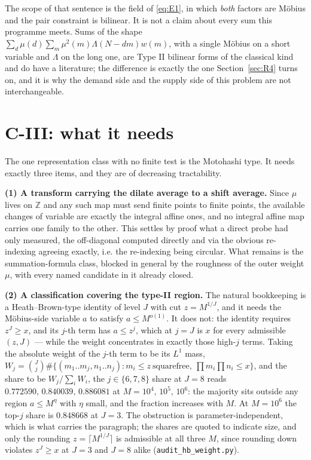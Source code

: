 \documentclass[11pt,a4paper]{article}
\theoremstyle{plain}
\theoremstyle{definition}
\theoremstyle{remark}
\begin{document}
The scope of that sentence is the field of \eqref{eq:E1}, in which
\emph{both} factors are M\"obius and the pair constraint is bilinear.
It is not a claim about every sum this programme meets. Sums of the
shape $\sum_d\mu(d)\sum_m\mu^2(m)\Lambda(N-dm)w(m)$, with a single
M\"obius on a short variable and $\Lambda$ on the long one, are Type II
bilinear forms of the classical kind and do have a literature; the
difference is exactly the one Section~\ref{sec:R4} turns on, and it is
why the demand side and the supply side of this problem are not
interchangeable.

\section{C-III: what it needs}\label{sec:c3}

The one representation class with no finite test is the Motohashi
type. It needs exactly three items, and they are of decreasing
tractability.

\medskip\noindent
\textbf{(1) A transform carrying the dilate average to a shift
average.} Since $\mu$ lives on $\mathbb Z$ and any such map must send
finite points to finite points, the available changes of variable are
exactly the integral affine ones, and no integral affine map carries
one family to the other. This settles by proof what a direct probe had
only measured, the off-diagonal computed directly and via the obvious
re-indexing agreeing exactly, i.e. the re-indexing being circular.
What remains is the summation-formula class, blocked in general by the
roughness of the outer weight $\mu$, with every named candidate in it
already closed.

\medskip\noindent
\textbf{(2) A classification covering the type-II region.} The natural
bookkeeping is a Heath--Brown-type identity of level $J$ with cut
$z=M^{1/J}$, and it needs the M\"obius-side variable $a$ to satisfy
$a\le M^{o(1)}$. It does not: the identity requires $z^J\ge x$, and its
$j$-th term has $a\le z^j$, which at $j=J$ is $x$ for every admissible
$(z,J)$ --- while the weight concentrates in exactly those high-$j$
terms. Taking the absolute weight of the $j$-th term to be its $L^1$
mass, $W_j=\binom{J}{j}\#\{(m_1..m_j,n_1..n_j):m_i\le z
\ \text{squarefree},\ \prod m_i\prod n_i\le x\}$, and the share to be
$W_j/\sum_iW_i$, the $j\in\{6,7,8\}$ share at $J=8$ reads
$0.772590,\,0.840039,\,0.886081$ at $M=10^4,\,10^5,\,10^6$: the
majority sits outside any region $a\le M^{\eta}$ with $\eta$ small,
and the fraction increases with $M$. At $M=10^6$ the top-$j$ share is
$0.848668$ at $J=3$. The obstruction is parameter-independent, which
is what carries the paragraph; the shares are quoted to indicate size,
and only the rounding $z=\lceil M^{1/J}\rceil$ is admissible at all
three $M$, since rounding down violates $z^J\ge x$ at $J=3$ and $J=8$
alike (\texttt{audit\_hb\_weight.py}).
\end{document}
